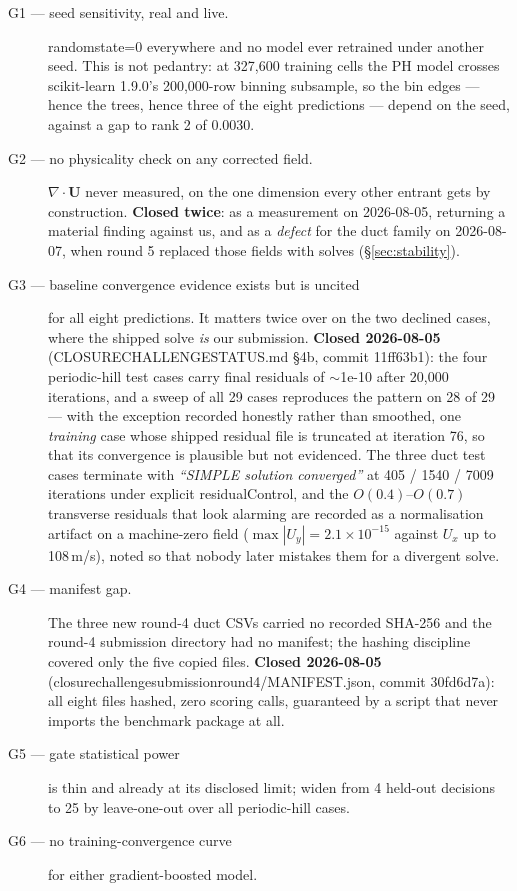 \documentclass[11pt,a4paper]{article}
\newcommand{\breakus}{\textunderscore\allowbreak}
\newcommand{\code}[1]{{\small\ttfamily\let\_\breakus #1}}
\newcommand{\artifact}[1]{{\footnotesize\ttfamily\let\_\breakus #1}}
\begin{document}
\begin{description}
\item[G1 --- seed sensitivity, real and live.] \code{random\_state=0} everywhere and no
  model ever retrained under another seed. This is not pedantry: at 327{,}600 training
  cells the PH model crosses scikit-learn 1.9.0's 200{,}000-row binning subsample, so the
  bin edges --- hence the trees, hence three of the eight predictions --- depend on the
  seed, against a gap to rank 2 of 0.0030.
\item[G2 --- no physicality check on any corrected field.] $\nabla\cdot\mathbf{U}$ never
  measured, on the one dimension every other entrant gets by construction. \textbf{Closed
  twice}: as a measurement on 2026-08-05, returning a material finding against us, and as a
  \emph{defect} for the duct family on 2026-08-07, when round 5 replaced those fields with
  solves (\S\ref{sec:stability}).
\item[G3 --- baseline convergence evidence exists but is uncited] for all eight
  predictions. It matters twice over on the two declined cases, where the shipped solve
  \emph{is} our submission. \textbf{Closed 2026-08-05}
  (\artifact{CLOSURE\_CHALLENGE\_STATUS.md} \S4b, commit \code{11ff63b1}): the four
  periodic-hill test cases carry
  final residuals of $\sim$1e-10 after 20{,}000 iterations, and a sweep of all 29 cases
  reproduces the pattern on 28 of 29 --- with the exception recorded honestly rather than
  smoothed, one \emph{training} case whose shipped residual file is truncated at iteration
  76, so that its convergence is plausible but not evidenced. The three duct test cases
  terminate with \emph{``SIMPLE solution converged''} at 405 / 1540 / 7009 iterations under
  explicit \code{residualControl}, and the $O(0.4)$--$O(0.7)$ transverse residuals that
  look alarming are recorded as a normalisation artifact on a machine-zero field
  ($\max|U_y| = 2.1\times10^{-15}$ against $U_x$ up to 108\,m/s), noted so that nobody
  later mistakes them for a divergent solve.
\item[G4 --- manifest gap.] The three new round-4 duct CSVs carried no recorded SHA-256 and
  the round-4 submission directory had no manifest; the hashing discipline covered only the
  five copied files. \textbf{Closed 2026-08-05}
  (\artifact{closure\_challenge\_submission\_round4/MANIFEST.json}, commit \code{30fd6d7a}):
  all eight files hashed, zero scoring calls, guaranteed by a script that never imports the
  benchmark package at all.
\item[G5 --- gate statistical power] is thin and already at its disclosed limit; widen from
  4 held-out decisions to 25 by leave-one-out over all periodic-hill cases.
\item[G6 --- no training-convergence curve] for either gradient-boosted model.
\end{description}
\end{document}
